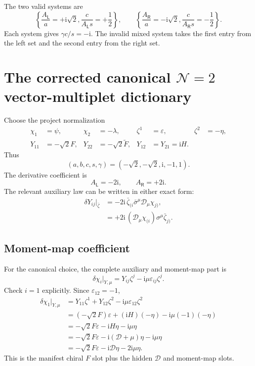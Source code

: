 \documentclass[11pt,a4paper,UTF8]{ctexart}
\numberwithin{equation}{section}
\newcommand{\ii}{\mathrm i}
\newcommand{\cD}{\mathcal D}
\newcommand{\eps}{\varepsilon}
\newcommand{\N}{\mathcal N}
\newcommand{\PL}{\mathsf L}
\newcommand{\PR}{\mathsf R}
\newcommand{\slot}{\big\vert}
\begin{document}
\begin{resultbox}
The two valid systems are
\[
\left\{
\frac{A_{\PL}}a=+\ii\sqrt2,
\frac{c}{A_{\PL}s}=+\frac12
\right\},
\qquad
\left\{
\frac{A_{\PR}}a=-\ii\sqrt2,
\frac{c}{A_{\PR}s}=-\frac12
\right\}.
\]
Each system gives $\gamma c/s=-\ii$. The invalid mixed system takes the first entry from the left set and the second entry from the right set.
\end{resultbox}

\section{The corrected canonical $\N=2$ vector-multiplet dictionary}

Choose the project normalization
\begin{align}
\chi_1&=\psi,
&\chi_2&=-\lambda,
&\zeta^1&=\eps,
&\zeta^2&=-\eta,
\label{eq:canonical-doublet}
\\
Y_{11}&=-\sqrt2F,
&Y_{22}&=-\sqrt2\widetilde F,
&Y_{12}&=Y_{21}=\ii H.
\label{eq:canonical-Y}
\end{align}
Thus
\begin{equation}
(a,b,c,s,\gamma)=(-\sqrt2,-\sqrt2,\ii,-1,1).
\label{eq:canonical-coeffs}
\end{equation}
The derivative coefficient is
\begin{equation}
A_{\PL}=-2\ii,
\qquad
A_{\PR}=+2\ii.
\label{eq:canonical-A}
\end{equation}
The relevant auxiliary law can be written in either exact form:
\begin{align}
\delta Y_{ij}\slot_{\bar\zeta}
&=-2\ii\,\bar\zeta_{(i}\bar\sigma^\mu\cD_\mu\chi_{j)},
\label{eq:canonical-Y-left}
\\
&=+2\ii\,(\cD_\mu\chi_{(i})\sigma^\mu\bar\zeta_{j)}.
\label{eq:canonical-Y-right}
\end{align}

\subsection{Moment-map coefficient}

For the canonical choice, the complete auxiliary and moment-map part is
\begin{equation}
\boxed{
\delta\chi_i\slot_{Y,\mu}
=Y_{ij}\zeta^j-\ii\mu\eps_{ij}\zeta^j.}
\label{eq:canonical-fermion}
\end{equation}
Check $i=1$ explicitly. Since $\eps_{12}=-1$,
\begin{align}
\delta\chi_1\slot_{Y,\mu}
&=Y_{11}\zeta^1+Y_{12}\zeta^2
-\ii\mu\eps_{12}\zeta^2
\\
&=(-\sqrt2F)\eps+(\ii H)(-\eta)
-\ii\mu(-1)(-\eta)
\\
&=-\sqrt2F\eps-\ii H\eta-\ii\mu\eta
\\
&=-\sqrt2F\eps-\ii(\mathscr D+\mu)\eta-\ii\mu\eta
\\
&=-\sqrt2F\eps-\ii\mathscr D\eta-2\ii\mu\eta.
\end{align}
This is the manifest chiral $F$ slot plus the hidden $\mathscr D$ and moment-map slots.
\end{document}
